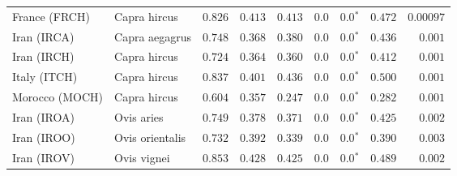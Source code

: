 \begin{center}
\begin{adjustbox}{width = 1\textwidth}
\begin{tabular}{|l|l|r|r|r|r|r|r|r|}
                  France (FRCH) &         Capra hircus &                                        $ 0.826$ &                                           $ 0.413$ &                      $ 0.413$ &            $0.0$ &                  $\bm{0.0{^*}}$ &                                           $ 0.472$ &          $0.00097$ \\
                    Iran (IRCA) &       Capra aegagrus &                                        $ 0.748$ &                                           $ 0.368$ &                      $ 0.380$ &            $0.0$ &                  $\bm{0.0{^*}}$ &                                           $ 0.436$ &           $ 0.001$ \\
                    Iran (IRCH) &         Capra hircus &                                        $ 0.724$ &                                           $ 0.364$ &                      $ 0.360$ &            $0.0$ &                  $\bm{0.0{^*}}$ &                                           $ 0.412$ &           $ 0.001$ \\
                   Italy (ITCH) &         Capra hircus &                                        $ 0.837$ &                                           $ 0.401$ &                      $ 0.436$ &            $0.0$ &                  $\bm{0.0{^*}}$ &                                           $ 0.500$ &           $ 0.001$ \\
                 Morocco (MOCH) &         Capra hircus &                                        $ 0.604$ &                                           $ 0.357$ &                      $ 0.247$ &            $0.0$ &                  $\bm{0.0{^*}}$ &                                           $ 0.282$ &           $ 0.001$ \\
                    Iran (IROA) &           Ovis aries &                                        $ 0.749$ &                                           $ 0.378$ &                      $ 0.371$ &            $0.0$ &                  $\bm{0.0{^*}}$ &                                           $ 0.425$ &           $ 0.002$ \\
                    Iran (IROO) &      Ovis orientalis &                                        $ 0.732$ &                                           $ 0.392$ &                      $ 0.339$ &            $0.0$ &                  $\bm{0.0{^*}}$ &                                           $ 0.390$ &           $ 0.003$ \\
                    Iran (IROV) &          Ovis vignei &                                        $ 0.853$ &                                           $ 0.428$ &                      $ 0.425$ &            $0.0$ &                  $\bm{0.0{^*}}$ &                                           $ 0.489$ &           $ 0.002$ \\

\end{tabular}
\end{adjustbox}
\end{center}
